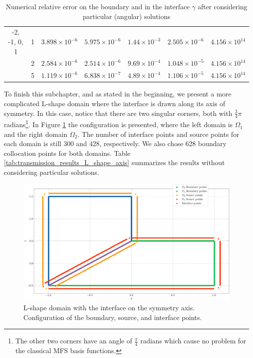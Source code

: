 \begin{table}[!htbp]
\begin{longtable}{ccccccc}
        -2, -1, 0, 1 & 1 & $3.898\times10^{-6}$ & $5.975\times10^{-6}$ & $1.44\times10^{-3}$ & $2.505\times10^{-6}$ & $4.156\times10^{14}$ \\
        & 2 & $2.584\times10^{-6}$ & $2.514\times10^{-6}$ & $9.69\times10^{-4}$ & $1.048\times10^{-5}$ & $4.156\times10^{14}$ \\
        & 5 & $1.119\times10^{-6}$ & $6.838\times10^{-7}$ & $4.89\times10^{-4}$ & $1.106\times10^{-5}$ & $4.156\times10^{14}$ \\
        \midrule[\heavyrulewidth] %
    \end{longtable}
    \caption{Numerical relative error on the boundary and in the interface \(\gamma\) after considering particular (angular) solutions}
    \label{tab:transmission_results_L_shape_rectangles_particular}
\end{table}

To finish this subchapter, and as stated in the beginning, we present a more complicated L-shape domain where the interface is drawn along its axis of symmetry. In this case, notice that there are two singular corners, both with \(\frac{3}{4}\pi\) radians\footnote{The other two corners have an angle of \(\frac{\pi}{4}\) radians which cause no problem for the classical \ac{MFS} basis functions.}. In Figure \ref{transmission_L_shape_col_axis_config} the configuration is presented, where the left domain is \(\Omega_1\) and the right domain \(\Omega_2\). The number of interface points and source points for each domain is still 300 and 428, respectively. We also chose 628 boundary collocation points for both domains. Table \ref{tab:transmission_results_L_shape_axis} summarizes the results without considering particular solutions.

\begin{figure}[!htb]
    \centering
    \includegraphics[height=0.4\linewidth,width=0.53\linewidth]{Images/Transmission/L_shape_2_axis_col_points.png}
    \caption{L-shape domain with the interface on the symmetry axis. Configuration of the boundary, source, and interface points.}
    \label{transmission_L_shape_col_axis_config}
\end{figure}

